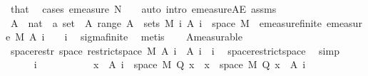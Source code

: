 \begin{isabellebody}
\ that\ \isamarkupfalse%
\ {\isacharparenleft}{\kern0pt}cases\ {\isachardoublequoteopen}emeasure\ N\ {\isasymOmega}\ {\isacharequal}{\kern0pt}\ {}{\isachardoublequoteclose}{\isacharcomma}{\kern0pt}\ auto\ intro{\isacharcolon}{\kern0pt}\ emeasure{\isacharunderscore}{\kern0pt}{}{\isacharunderscore}{\kern0pt}AE\ assms{\isacharparenleft}{\kern0pt}{}{\isacharparenright}{\kern0pt}{\isacharparenright}{\kern0pt}\isanewline
\isanewline
\ \ \isamarkupfalse%
\ A\ {\isacharcolon}{\kern0pt}{\isacharcolon}{\kern0pt}\ {\isachardoublequoteopen}nat\ {\isasymRightarrow}\ {\isacharprime}{\kern0pt}a\ set{\isachardoublequoteclose}\ \ A{\isacharcolon}{\kern0pt}\ {\isachardoublequoteopen}range\ A\ {\isasymsubseteq}\ sets\ M{\isachardoublequoteclose}\ {\isachardoublequoteopen}{\isacharparenleft}{\kern0pt}{\isasymUnion}i{\isachardot}{\kern0pt}\ A\ i{\isacharparenright}{\kern0pt}\ {\isacharequal}{\kern0pt}\ space\ M{\isachardoublequoteclose}\ \ emeasure{\isacharunderscore}{\kern0pt}finite{\isacharcolon}{\kern0pt}\ {\isachardoublequoteopen}emeasure\ M\ {\isacharparenleft}{\kern0pt}A\ i{\isacharparenright}{\kern0pt}\ {\isasymnoteq}\ {\isasyminfinity}{\isachardoublequoteclose}\ \ i\ \isamarkupfalse%
\ sigma{\isacharunderscore}{\kern0pt}finite\ \isamarkupfalse%
\ metis\isanewline
\ \ \isamarkupfalse%
\ A{\isacharparenleft}{\kern0pt}{}{\isacharparenright}{\kern0pt}{\isacharbrackleft}{\kern0pt}measurable{\isacharbrackright}{\kern0pt}\isanewline
\ \ \isamarkupfalse%
\ space{\isacharunderscore}{\kern0pt}restr{\isacharcolon}{\kern0pt}\ {\isachardoublequoteopen}space\ {\isacharparenleft}{\kern0pt}restrict{\isacharunderscore}{\kern0pt}space\ M\ {\isacharparenleft}{\kern0pt}A\ i{\isacharparenright}{\kern0pt}{\isacharparenright}{\kern0pt}\ {\isacharequal}{\kern0pt}\ A\ i{\isachardoublequoteclose}\ \ i\ \isamarkupfalse%
\ space{\isacharunderscore}{\kern0pt}restrict{\isacharunderscore}{\kern0pt}space\ \isamarkupfalse%
\ simp\isanewline
\ \ \isacommand{{\isacharbraceleft}{\kern0pt}}\isamarkupfalse%
\isanewline
\ \ \ \ \isamarkupfalse%
\ i\ \ \ \ \isanewline
\ \ \ \ \isamarkupfalse%
\ {\isacharasterisk}{\kern0pt}{\isacharcolon}{\kern0pt}\ {\isachardoublequoteopen}{\isacharbraceleft}{\kern0pt}x\ {\isasymin}\ A\ i\ {\isasyminter}\ space\ M{\isachardot}{\kern0pt}\ Q\ x{\isacharbraceright}{\kern0pt}\ {\isacharequal}{\kern0pt}\ {\isacharbraceleft}{\kern0pt}x\ {\isasymin}\ space\ M{\isachardot}{\kern0pt}\ Q\ x{\isacharbraceright}{\kern0pt}\ {\isasyminter}\ {\isacharparenleft}{\kern0pt}A\ i{\isacharparenright}{\kern0pt}{\isachardoublequoteclose}\ \isamarkupfalse%

\end{isabellebody}
